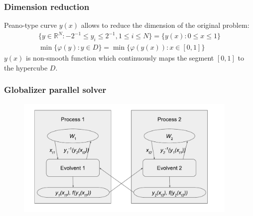 \documentclass[aspectratio=1610]{beamer}
\begin{document}
\begin{frame}
  \begin{center}
  \frametitle{Dimension reduction}
  Peano-type curve \(y(x)\) allows to reduce the dimension of the original problem:
  \begin{gather}
    \lbrace y\in \mathbb{R}^N:-2^{-1}\leqslant y_i\leqslant 2^{-1},1\leqslant i\leqslant N\rbrace=\{y(x):0\leqslant x\leqslant 1\} \nonumber \\
    \min\{\varphi(y): y\in D\}=\min\{\varphi(y(x)): x\in [0,1]\} \nonumber
  \end{gather}
  \(y(x)\) is non-smooth function which continuously maps the segment \([0,1]\) to the hypercube \(D\).
  \begin{figure}[ht]
    \vspace*{-0.5cm}
  \end{figure}
\end{center}
\end{frame}

\begin{frame}
  \frametitle{Globalizer parallel solver}
  \begin{figure}[ht]
    \includegraphics[width=0.95\textwidth]{evolvents_parallel.pdf}
  \end{figure}
\end{frame}
\end{document}
